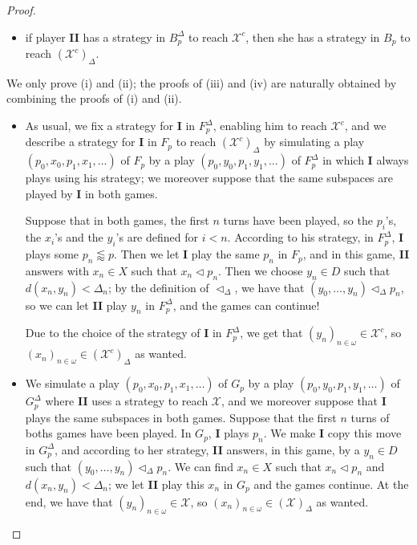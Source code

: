 \documentclass[a4paper,11pt]{article}
\theoremstyle{definition}
\numberwithin{equation}{section}
\newcommand{\X}{\mathcal{X}}
\newcommand{\I}{\textbf{I}}
\newcommand{\II}{\textbf{II}}
\begin{document}
\begin{proof}
\begin{itemize}
\item[(iv)] if player \II{} has a strategy in $B_p^\Delta$ to reach $\X^c$, then she has a strategy in $B_p$ to reach $(\X^c)_\Delta$.

\end{itemize}

\noindent We only prove (i) and (ii); the proofs of (iii) and (iv) are naturally obtained by combining the proofs of (i) and (ii).

\begin{itemize}

\item[(i)] As usual, we fix a strategy for \I{} in $F_p^\Delta$, enabling him to reach $\X^c$, and we describe a strategy for \I{} in $F_p$ to reach $(\X^c)_\Delta$ by simulating a play $(p_0, x_0, p_1, x_1, \ldots)$ of $F_p$ by a play $(p_0, y_0, p_1, y_1, \ldots)$ of $F_p^\Delta$ in which \I{} always plays using his strategy; we moreover suppose that the same subspaces are played by \I{} in both games.

\smallskip

Suppose that in both games, the first $n$ turns have been played, so the $p_i$'s, the $x_i$'s and the $y_i$'s are defined for $i < n$. According to his strategy, in $F_p^\Delta$, \I{} plays some $p_n \lessapprox p$. Then we let \I{} play the same $p_n$ in $F_p$, and in this game, \II{} answers with $x_n \in X$ such that $x_n \vartriangleleft p_n$. Then we choose $y_n \in D$ such that $d(x_n, y_n) < \Delta_n$; by the definition of $\vartriangleleft_\Delta$, we have that $(y_0, \ldots, y_n) \vartriangleleft_\Delta p_n$, so we can let \II{} play $y_n$ in $F_p^\Delta$, and the games can continue!

\smallskip

Due to the choice of the strategy of \I{} in $F_p^\Delta$, we get that $(y_n)_{n \in \omega} \in \X^c$, so $(x_n)_{n \in \omega} \in (\X^c)_\Delta$ as wanted.

\item[(ii)] We simulate a play $(p_0, x_0, p_1, x_1, \ldots)$ of $G_p$ by a play $(p_0, y_0, p_1, y_1, \ldots)$ of $G_p^\Delta$ where \II{} uses a strategy to reach $\X$, and we moreover suppose that \I{} plays the same subspaces in both games. Suppose that the first $n$ turns of boths games have been played. In $G_p$, \I{} plays $p_n$. We make \I{} copy this move in $G_p^\Delta$, and according to her strategy, \II{} answers, in this game, by a $y_n \in D$ such that $(y_0, \ldots, y_n) \vartriangleleft_\Delta p_n$. We can find $x_n \in X$ such that $x_n \vartriangleleft p_n$ and $d(x_n, y_n) < \Delta_n$; we let \II{} play this $x_n$ in $G_p$ and the games continue. At the end, we have that $(y_n)_{n \in \omega} \in \X$, so $(x_n)_{n \in \omega} \in (\X)_\Delta$ as wanted.

\end{itemize}

\end{proof}
\end{document}
